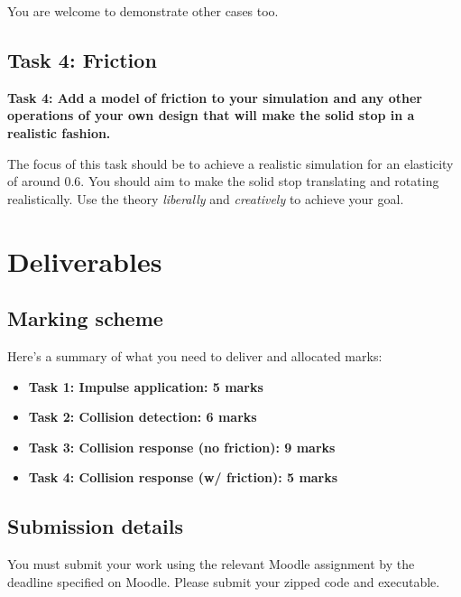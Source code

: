\documentclass[12pt]{article}
\begin{document}
You are welcome to demonstrate other cases too.

\subsection*{Task 4: Friction}

\textbf{Task 4: Add a model of friction to your simulation and any other operations of your own design that will make the solid stop in a realistic fashion.}

The focus of this task should be to achieve a realistic simulation for an elasticity of around 0.6. You should aim to make the solid stop translating and rotating realistically. Use the theory \emph{liberally} and \emph{creatively} to achieve your goal.

\section*{Deliverables}

\subsection*{Marking scheme}

Here's a summary of what you need to deliver and allocated marks:
\begin{itemize}
\item \textbf{Task 1: Impulse application: 5 marks}
\item \textbf{Task 2: Collision detection: 6 marks}
\item \textbf{Task 3: Collision response (no friction): 9 marks}
\item \textbf{Task 4: Collision response (w/ friction): 5 marks}
\end{itemize}

\subsection*{Submission details}

You must submit your work using the relevant Moodle assignment by the deadline specified on Moodle. Please submit your zipped code and executable.
\end{document}
